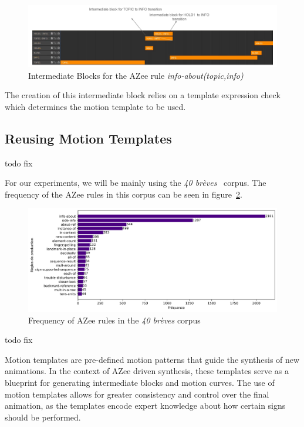 \documentclass[../../main.tex]{subfiles}
\begin{document}
\begin{figure}
    \centering \includegraphics[width = 5in]{chapters/intermediate_blocks/images/info_about_intermediate_example.png}
    \caption{Intermediate Blocks for the AZee rule \emph{info-about(topic,info)}}
    \label{fig:info_about_intermediate_example}
\end{figure}

The creation of this intermediate block relies on a template expression check which determines the motion template to be used. 

\subsection{Reusing Motion Templates}
\label{ch:intermediate_blocks_pose_correction:reusing_motion_templates}

todo fix

For our experiments, we will be mainly using the \emph{40 brèves}~\cite{challant2022first} corpus. The frequency of the AZee rules in this corpus can be seen in figure~\ref{fig:azee_rule_frequency}.

\begin{figure}
    \centering \includegraphics[width = 5in]{chapters/intermediate_blocks/images/azee_rule_frequency.png}
    \caption{Frequency of AZee rules in the \emph{40 brèves} corpus}
    \label{fig:azee_rule_frequency}
\end{figure}

todo fix


Motion templates are pre-defined motion patterns that guide the synthesis of new animations. In the context of AZee driven synthesis, these templates serve as a blueprint for generating intermediate blocks and motion curves. The use of motion templates allows for greater consistency and control over the final animation, as the templates encode expert knowledge about how certain signs should be performed.
\end{document}
